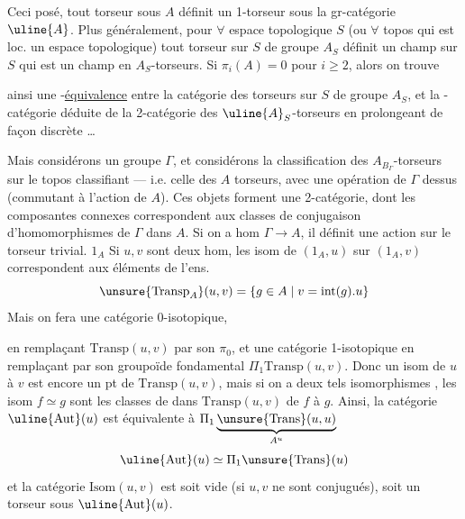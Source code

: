 Ceci posé, tout torseur sous \(A\) définit un 1-torseur sous la gr-catégorie \(\uline{A}\). Plus généralement, pour \(\forall\) espace topologique \(S\) (ou \(\forall\) topos qui est loc. un espace topologique) tout torseur sur \(S\) de groupe \(A_S\) définit un champ sur \(S\) qui est un  champ en \(A_S\)-torseurs. Si \(\pi_i(A)=0\) pour \(i\geq2\), alors on trouve



ainsi  une -\uline{équivalence} entre la catégorie des torseurs sur \(S\) de groupe \(A_S\), et la -catégorie déduite de la 2-catégorie des  \(\uline{A}_S\)-torseurs en  prolongeant de façon discrète \ldots

Mais considérons  un groupe \(\Gamma\), et considérons la classification des \(A_{B_\Gamma}\)-torseurs sur le topos classifiant --- i.e. celle des \(A\) torseurs, avec une opération de \(\Gamma\) dessus (commutant à l'action de \(A\)). Ces objets forment une 2-catégorie, dont les composantes connexes correspondent aux classes de conjugaison d'homomorphismes de \(\Gamma\) dans \(A\). Si on a   hom \(\Gamma\to A\), il définit  une action sur le torseur trivial. \(1_A\) Si \(u,v\) sont deux hom, les isom de \((1_A,u)\) sur \((1_A,v)\) correspondent aux éléments de l'ens. 
\[
\unsure{\mathrm{Transp}_A}(u,v)=\{g\in A\mid v=\mathrm{int}(g).u\}
\]
Mais on fera une catégorie 0-isotopique,



en remplaçant \(\mathrm{Transp}(u,v)\) par son \(\pi_0\), et une catégorie 1-isotopique en  remplaçant par son groupoïde fondamental \(\Pi_1\mathrm{Transp}(u,v)\). Donc un isom de \(u\) à \(v\) est encore un pt de \(\mathrm{Transp}(u,v)\), mais si on a deux tels isomorphismes , les isom \(f\simeq g\) sont les classes de  dans \(\mathrm{Transp}(u,v)\) de \(f\) à \(g\). Ainsi, la catégorie \(\uline{\mathrm{Aut}}(u)\) est équivalente à \(\Pi_1\underbrace{\unsure{\mathrm{Trans}}(u,u)}_{A^u}\) 
\[
\uline{\mathrm{Aut}}(u)\simeq\Pi_1\unsure{\mathrm{Trans}}(u)
\]
et la  catégorie \(\mathrm{Isom}(u,v)\) est soit vide (si \(u,v\) ne sont conjugués), soit un torseur sous \(\uline{\mathrm{Aut}}(u)\).

